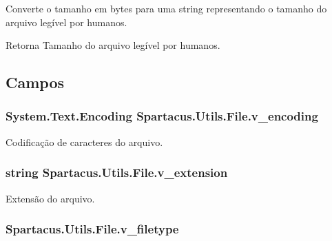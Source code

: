 Converte o tamanho em bytes para uma string representando o tamanho do arquivo legível por humanos. 

\begin{DoxyReturn}{Retorna}
Tamanho do arquivo legível por humanos. 
\end{DoxyReturn}


\subsection{Campos}
\hypertarget{classSpartacus_1_1Utils_1_1File_af7a6fb35b3396d68a88c111ef642ab4f}{
\subsubsection[{v\+\_\+encoding}]{\setlength{\rightskip}{0pt plus 5cm}System.\+Text.\+Encoding Spartacus.\+Utils.\+File.\+v\+\_\+encoding}}\label{classSpartacus_1_1Utils_1_1File_af7a6fb35b3396d68a88c111ef642ab4f}


Codificação de caracteres do arquivo. 

\hypertarget{classSpartacus_1_1Utils_1_1File_a8a2d38a5f48438d53858e6800313d45c}{
\subsubsection[{v\+\_\+extension}]{\setlength{\rightskip}{0pt plus 5cm}string Spartacus.\+Utils.\+File.\+v\+\_\+extension}}\label{classSpartacus_1_1Utils_1_1File_a8a2d38a5f48438d53858e6800313d45c}


Extensão do arquivo. 

\hypertarget{classSpartacus_1_1Utils_1_1File_ab7b8ce972a88dde2ffab4ad63c4cc637}{
\subsubsection[{v\+\_\+filetype}]{ Spartacus.\+Utils.\+File.\+v\+\_\+filetype}}\label{classSpartacus_1_1Utils_1_1File_ab7b8ce972a88dde2ffab4ad63c4cc637}


